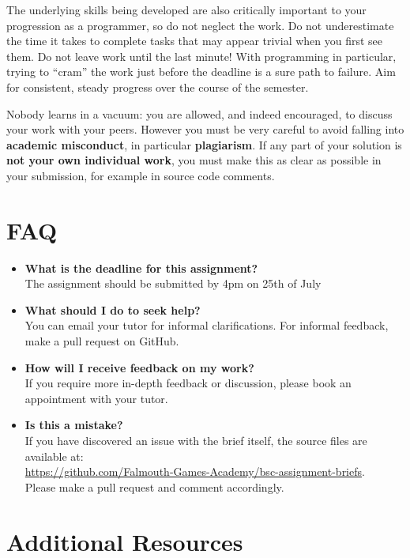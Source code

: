 \documentclass{../../../fal_assignment}
\begin{document}
	The underlying skills being developed are also critically important to your progression as a programmer, so do not neglect the work.
	Do not underestimate the time it takes to complete tasks that may appear trivial when you first see them.
	Do not leave work until the last minute! With programming in particular, trying to ``cram'' the work just before the deadline is a sure path to failure. Aim for consistent, steady progress over the course of the semester.
	
	Nobody learns in a vacuum: you are allowed, and indeed encouraged, to discuss your work with your peers. However you must be very careful to avoid falling into \textbf{academic misconduct}, in particular \textbf{plagiarism}. If any part of your solution is \textbf{not your own individual work}, you must make this as clear as possible in your submission, for example in source code comments.
	
	\section*{FAQ}
	
	\begin{itemize}
		\item 	\textbf{What is the deadline for this assignment?} \\ 
		The assignment should be submitted by 4pm on 25th of July
		
		\item 	\textbf{What should I do to seek help?} \\ 
		You can email your tutor for informal clarifications. For informal feedback, make a pull request on GitHub. 
		
		\item 	\textbf{How will I receive feedback on my work?} \\ 
		If you require more in-depth feedback or discussion, please book an appointment with your tutor.
		
		\item 	\textbf{Is this a mistake?} \\ 	
		If you have discovered an issue with the brief itself, the source files are available at: \\
		\url{https://github.com/Falmouth-Games-Academy/bsc-assignment-briefs}.\\
		Please make a pull request and comment accordingly.
	\end{itemize}
	
	\section*{Additional Resources}
	
\end{document}
